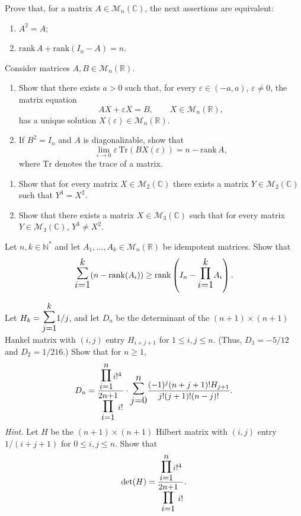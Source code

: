 \documentclass[12pt]{article}
\let\oldsum\sum
\let\oldprod\prod
\renewcommand{\sum}{\mathlarger{\mathlarger{\oldsum}}}
\renewcommand{\prod}{\mathlarger{\mathlarger{\oldprod}}}
\begin{document}
\begin{problem}
Prove that, for a matrix $A \in \mathcal{M}_n(\mathbb{C})$, the next assertions are equivalent:
\begin{enumerate}[label=(\alph*)]
\item $A^2 = A$;
\item $\mathrm{rank}\,A + \mathrm{rank}(I_n - A) = n$.
\end{enumerate}
\end{problem}

\begin{problem}
Consider matrices $A, B \in \mathcal{M}_n(\mathbb{R})$.
\begin{enumerate}[label=(\alph*)]
\item Show that there exists $a > 0$ such that, for every $\varepsilon \in (-a,a)$, $\varepsilon \neq 0$, the matrix equation
\[
AX + \varepsilon X = B, \qquad X \in \mathcal{M}_n(\mathbb{R}),
\]
has a unique solution $X(\varepsilon) \in \mathcal{M}_n(\mathbb{R})$.
\item If $B^2 = I_n$ and $A$ is diagonalizable, show that
\[
\lim_{\varepsilon \to 0} \varepsilon\, \mathrm{Tr}(BX(\varepsilon)) = n - \mathrm{rank}\, A,
\]
where $\mathrm{Tr}$ denotes the trace of a matrix.
\end{enumerate}
\end{problem}

\begin{problem}
\begin{enumerate}[label=(\alph*)]
\item Show that for every matrix $X \in \mathcal{M}_2(\mathbb{C})$ there exists a matrix $Y \in \mathcal{M}_2(\mathbb{C})$ such that $Y^3 = X^2$.
\item Show that there exists a matrix $X \in \mathcal{M}_3(\mathbb{C})$ such that for every matrix $Y \in \mathcal{M}_3(\mathbb{C})$, $Y^3 \neq X^2$.
\end{enumerate}
\end{problem}

\begin{problem}
Let $n, k \in \mathbb{N}^*$ and let $A_1, \ldots, A_k \in \mathcal{M}_n(\mathbb{R})$ be idempotent matrices. Show that
\[
\sum_{i=1}^{k} (n - \mathrm{rank}(A_i)) \geq \mathrm{rank}\left(I_n - \prod_{i=1}^{k} A_i\right).
\]
\end{problem}

\begin{problem}
Let $H_k = \sum_{j=1}^{k} 1/j$, and let $D_n$ be the determinant of the $(n+1)\times(n+1)$ Hankel matrix with $(i,j)$ entry $H_{i+j+1}$ for $1 \leq i,j \leq n$. (Thus, $D_1 = -5/12$ and $D_2 = 1/216$.) Show that for $n \geq 1$,
\[
D_n = \frac{\prod_{i=1}^{n} i!^4}{\prod_{i=1}^{2n+1} i!} \cdot \sum_{j=0}^{n} \frac{(-1)^j (n+j+1)! H_{j+1}}{j!(j+1)!(n-j)!}.
\]
\textit{Hint.} Let $H$ be the $(n+1)\times(n+1)$ Hilbert matrix with $(i,j)$ entry $1/(i+j+1)$ for $0 \leq i,j \leq n$. Show that
\[
\det(H) = \frac{\prod_{i=1}^{n} i!^4}{\prod_{i=1}^{2n+1} i!}.
\]
\end{problem}
\end{document}
